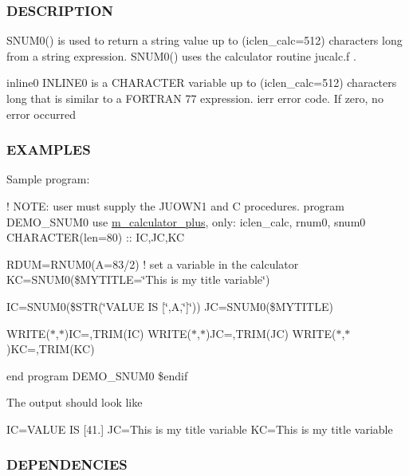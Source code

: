 \subsubsection*{D\+E\+S\+C\+R\+I\+P\+T\+I\+ON}

S\+N\+U\+M0() is used to return a string value up to (iclen\+\_\+calc=512) characters long from a string expression. S\+N\+U\+M0() uses the calculator routine jucalc.\+f .

inline0 I\+N\+L\+I\+N\+E0 is a C\+H\+A\+R\+A\+C\+T\+ER variable up to (iclen\+\_\+calc=512) characters long that is similar to a F\+O\+R\+T\+R\+AN 77 expression. ierr error code. If zero, no error occurred

\subsubsection*{E\+X\+A\+M\+P\+L\+ES}

Sample program\+:

! N\+O\+TE\+: user must supply the J\+U\+O\+W\+N1 and C procedures. program D\+E\+M\+O\+\_\+\+S\+N\+U\+M0 use \hyperlink{namespacem__calculator__plus}{m\+\_\+calculator\+\_\+plus}, only\+: iclen\+\_\+calc, rnum0, snum0 C\+H\+A\+R\+A\+C\+T\+ER(len=80) \+:\+: IC,JC,KC

R\+D\+UM=R\+N\+U\+M0(\textquotesingle{}A=83/2\textquotesingle{}) ! set a variable in the calculator KC=S\+N\+U\+M0(\textquotesingle{}\$\+M\+Y\+T\+I\+T\+LE=\char`\"{}\+This is my title variable\char`\"{}\textquotesingle{})

IC=S\+N\+U\+M0(\textquotesingle{}\$\+S\+TR(\char`\"{}\+V\+A\+L\+U\+E I\+S \mbox{[}\char`\"{},A,\char`\"{}\mbox{]}\char`\"{})\textquotesingle{}) JC=S\+N\+U\+M0(\textquotesingle{}\$\+M\+Y\+T\+I\+T\+LE\textquotesingle{})

W\+R\+I\+T\+E($\ast$,$\ast$)\textquotesingle{}IC=\textquotesingle{},T\+R\+I\+M(\+I\+C) W\+R\+I\+T\+E($\ast$,$\ast$)\textquotesingle{}JC=\textquotesingle{},T\+R\+I\+M(\+J\+C) W\+R\+I\+T\+E($\ast$,$\ast$)\textquotesingle{}KC=\textquotesingle{},T\+R\+I\+M(\+K\+C)

end program D\+E\+M\+O\+\_\+\+S\+N\+U\+M0 \$endif

The output should look like

IC=V\+A\+L\+UE IS \mbox{[}41.\mbox{]} JC=This is my title variable KC=This is my title variable

\subsubsection*{D\+E\+P\+E\+N\+D\+E\+N\+C\+I\+ES}


